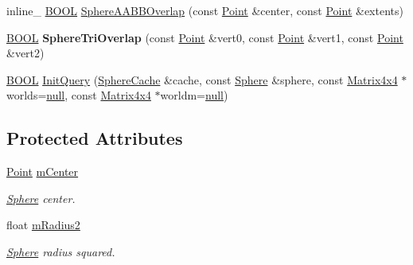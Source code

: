 \begin{DoxyCompactItemize}
\item 
inline\+\_\+ \hyperlink{_ice_types_8h_a050c65e107f0c828f856a231f4b4e788}{B\+O\+O\+L} \hyperlink{class_sphere_collider_a0da986f7072db69aef2e3a235f689e85}{Sphere\+A\+A\+B\+B\+Overlap} (const \hyperlink{class_point}{Point} \&center, const \hyperlink{class_point}{Point} \&extents)
\item 
\hypertarget{class_sphere_collider_aec2406200ff4a3acd33fe5487f6928bd}{\hyperlink{_ice_types_8h_a050c65e107f0c828f856a231f4b4e788}{B\+O\+O\+L} {\bfseries Sphere\+Tri\+Overlap} (const \hyperlink{class_point}{Point} \&vert0, const \hyperlink{class_point}{Point} \&vert1, const \hyperlink{class_point}{Point} \&vert2)}\label{class_sphere_collider_aec2406200ff4a3acd33fe5487f6928bd}

\item 
\hyperlink{_ice_types_8h_a050c65e107f0c828f856a231f4b4e788}{B\+O\+O\+L} \hyperlink{class_sphere_collider_a40182e3140a9bc25efd1d8a8a8ea95ea}{Init\+Query} (\hyperlink{struct_sphere_cache}{Sphere\+Cache} \&cache, const \hyperlink{class_sphere}{Sphere} \&sphere, const \hyperlink{class_matrix4x4}{Matrix4x4} $\ast$worlds=\hyperlink{_ice_types_8h_ac97b8ee753e4405397a42ad5799b0f9e}{null}, const \hyperlink{class_matrix4x4}{Matrix4x4} $\ast$worldm=\hyperlink{_ice_types_8h_ac97b8ee753e4405397a42ad5799b0f9e}{null})
\end{DoxyCompactItemize}
\subsection*{Protected Attributes}
\begin{DoxyCompactItemize}
\item 
\hypertarget{class_sphere_collider_ae8ec8e2adbc34a34157272fe728899af}{\hyperlink{class_point}{Point} \hyperlink{class_sphere_collider_ae8ec8e2adbc34a34157272fe728899af}{m\+Center}}\label{class_sphere_collider_ae8ec8e2adbc34a34157272fe728899af}

\begin{DoxyCompactList}\small\item\em \hyperlink{class_sphere}{Sphere} center. \end{DoxyCompactList}\item 
\hypertarget{class_sphere_collider_aecd3702a63f1197551254c802fe53fdc}{float \hyperlink{class_sphere_collider_aecd3702a63f1197551254c802fe53fdc}{m\+Radius2}}\label{class_sphere_collider_aecd3702a63f1197551254c802fe53fdc}

\begin{DoxyCompactList}\small\item\em \hyperlink{class_sphere}{Sphere} radius squared. \end{DoxyCompactList}\end{DoxyCompactItemize}


